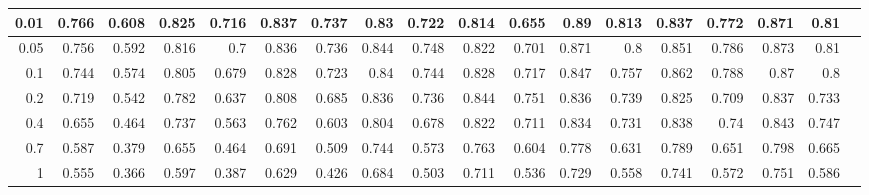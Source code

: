 \documentclass{article}
\begin{document}
\begin{sidewaystable}[b]
{\begin{tabular}{|r|r|r|r|r|r|r|r|r|r|r|r|r|r|r|r|r|r|}
\hline
0.01 & 0.766 & 0.608 & 0.825 & 0.716 & 0.837 & 0.737 & 0.83  & 0.722 & 0.814 & 0.655 & 0.89  & 0.813 & 0.837 & 0.772 & 0.871 & 0.81  \\
\hline
0.05 & 0.756 & 0.592 & 0.816 & 0.7   & 0.836 & 0.736 & 0.844 & 0.748 & 0.822 & 0.701 & 0.871 & 0.8   & 0.851 & 0.786 & 0.873 & 0.81  \\
\hline
0.1  & 0.744 & 0.574 & 0.805 & 0.679 & 0.828 & 0.723 & 0.84  & 0.744 & 0.828 & 0.717 & 0.847 & 0.757 & 0.862 & 0.788 & 0.87  & 0.8   \\
\hline
0.2  & 0.719 & 0.542 & 0.782 & 0.637 & 0.808 & 0.685 & 0.836 & 0.736 & 0.844 & 0.751 & 0.836 & 0.739 & 0.825 & 0.709 & 0.837 & 0.733 \\
\hline
0.4  & 0.655 & 0.464 & 0.737 & 0.563 & 0.762 & 0.603 & 0.804 & 0.678 & 0.822 & 0.711 & 0.834 & 0.731 & 0.838 & 0.74  & 0.843 & 0.747 \\
\hline
0.7  & 0.587 & 0.379 & 0.655 & 0.464 & 0.691 & 0.509 & 0.744 & 0.573 & 0.763 & 0.604 & 0.778 & 0.631 & 0.789 & 0.651 & 0.798 & 0.665 \\
\hline
1    & 0.555 & 0.366 & 0.597 & 0.387 & 0.629 & 0.426 & 0.684 & 0.503 & 0.711 & 0.536 & 0.729 & 0.558 & 0.741 & 0.572 & 0.751 & 0.586 \\
\hline
    \end{tabular}
}
\end{sidewaystable}

    
\end{document}
